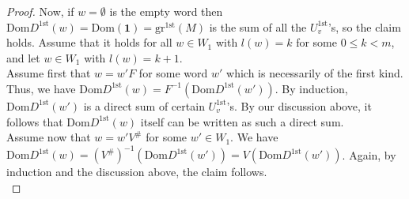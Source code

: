 \documentclass[12pt]{amsart}
\theoremstyle{definition}
\newcommand{\<}{\langle}   %
\renewcommand{\>}{\rangle} %
\begin{document}
\begin{proof}
    Now, if $w = \emptyset$ is the empty word then $\mathrm{Dom}D^{1\mathrm{st}}(w) = \mathrm{Dom}(\mathbf 1) = \mathrm{gr}^{1\mathrm{st}}(M)$ is the sum of all the $U^{1\mathrm{st}}_v$'s, so the claim holds. Assume that it holds for all $w \in W_1$ with $l(w) = k$ for some $0 \leq k < m$, and let $w \in W_1$ with $l(w) = k+1$.\\
    Assume first that $w = w'F$ for some word $w'$ which is necessarily of the first kind. Thus, we have $\mathrm{Dom}D^{1\mathrm{st}}(w) = F^{-1}(\mathrm{Dom}D^{1\mathrm{st}}(w'))$. By induction, $\mathrm{Dom}D^{1\mathrm{st}}(w')$ is a direct sum of certain $U^{1\mathrm{st}}_v$'s. By our discussion above, it follows that $\mathrm{Dom}D^{1\mathrm{st}}(w)$ itself can be written as such a direct sum.\\
    \sloppy Assume now that $w = w'V^{\#}$ for some $w' \in W_1$. We have $\mathrm{Dom}D^{1\mathrm{st}}(w) = (V^{\#})^{-1}(\mathrm{Dom}D^{1\mathrm{st}}(w')) = V(\mathrm{Dom}D^{1\mathrm{st}}(w'))$. Again, by induction and the discussion above, the claim follows.\\


\end{proof}
\end{document}
